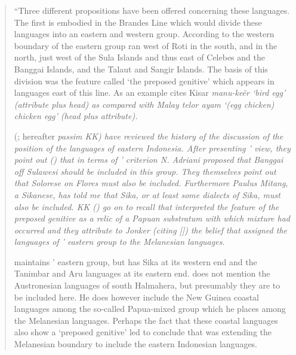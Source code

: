 \begin{quote}
	``Three different propositions have been offered concerning these languages.
	The first is embodied in the Brandes Line which would divide these languages
	into an eastern and western group.
	According to \citeauthor{Brandes1884} the western boundary
	of the eastern group ran west of Roti in the south,
	and in the north, just west of the Sula Islands
	and thus east of Celebes and the Banggai Islands,
	and the Talaut and Sangir Islands.
	The basis of this division was the feature called ‘the preposed genitive’ which appears in languages east of this line.
	As an example \citeauthor{Brandes1884} cites Kisar \it{manu-keër} \it{‘bird egg’}
	(attribute plus head) as compared with Malay \it{telor ayam}
	\it{‘(egg chicken) chicken egg’} (head plus attribute).

	\citeauthor{KanskiKasprusch1931} (\citeyear{KanskiKasprusch1931}; hereafter \it{passim} KK) have reviewed
	the history of the discussion of the position of the languages of eastern Indonesia.
	After presenting \citeauthor{Brandes1884}’ view,
	they point out (\citeyear[883]{KanskiKasprusch1931})
	that in terms of \citeauthor{Brandes1884}’ criterion N.
	Adriani proposed that Banggai off Sulawesi should be included in this group.
	They themselves point out that Solorese on Flores must also be included.
	Furthermore Paulus Mitang, a Sikanese, has told me that Sika,
	or at least some dialects of Sika, must also be included.
	KK (\citeyear[884]{KanskiKasprusch1931}) go on to recall that \citeauthor{Schmidt1926}
	interpreted the feature of the preposed
	genitive as a relic of a Papuan substratum with which mixture had occurred
	and they attribute to Jonker (citing \citeauthor{Jonker1914} [\citeyear[4]{Jonker1914}])
	the belief that \citeauthor{Schmidt1926}
	assigned the languages of \citeauthor{Brandes1884}’ eastern group to the Melanesian languages.

	\citet{Schmidt1926} maintains \citeauthor{Brandes1884}’ eastern group,
	but has Sika at its western end and the Tanimbar
	and Aru languages at its eastern end.
	\citeauthor{Schmidt1926} does not mention the Austronesian languages of south Halmahera,
	but presumably they are to be included here.
	He does however include the New Guinea coastal languages among
	the so-called Papua-mixed group which he places among the Melanesian languages.
	Perhaps the fact that these coastal languages also show a
	‘preposed genitive’ led \citeauthor{Jonker1914} to conclude that \citeauthor{Schmidt1926}
	was extending the Melanesian boundary to include the eastern Indonesian languages.


\end{quote}
